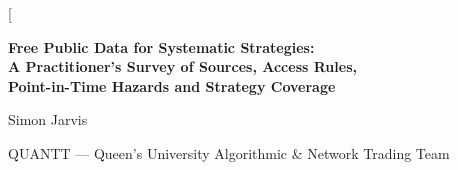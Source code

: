 \documentclass[10pt, a4paper, twocolumn]{article}
\begin{document}
\raggedbottom

\twocolumn[{%
\begin{center}
{\LARGE\bfseries Free Public Data for Systematic Strategies:\\
A Practitioner's Survey of Sources, Access Rules,\\ Point-in-Time Hazards and Strategy Coverage\par}
\vspace{0.8em}
{\large Simon Jarvis\par}
\vspace{0.4em}
{\normalsize
QUANTT --- Queen's University Algorithmic \& Network Trading Team\\
\vspace{0.3em}
}
\vspace{0.5em}


\end{center}}
\end{document}
